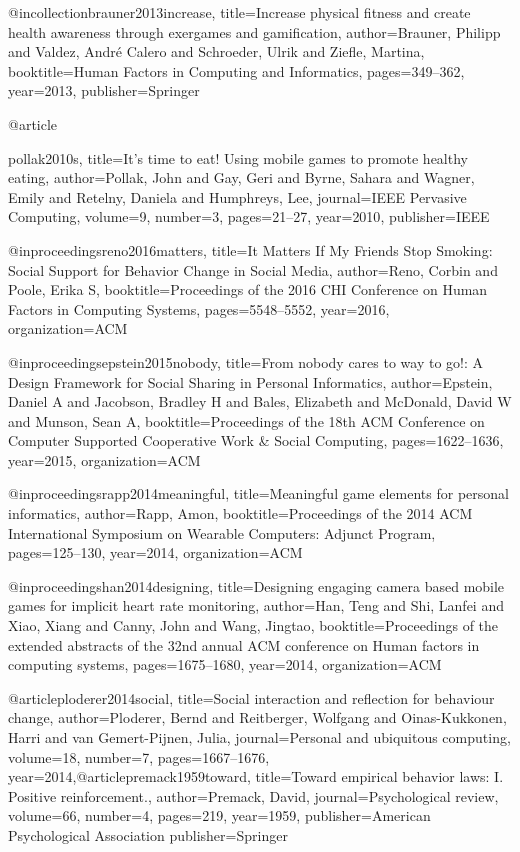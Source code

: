 @incollection{brauner2013increase,
  title={Increase physical fitness and create health awareness through exergames and gamification},
  author={Brauner, Philipp and Valdez, Andr{\'e} Calero and Schroeder, Ulrik and Ziefle, Martina},
  booktitle={Human Factors in Computing and Informatics},
  pages={349--362},
  year={2013},
  publisher={Springer}
}

@article{pollak2010s,
  title={It's time to eat! Using mobile games to promote healthy eating},
  author={Pollak, John and Gay, Geri and Byrne, Sahara and Wagner, Emily and Retelny, Daniela and Humphreys, Lee},
  journal={IEEE Pervasive Computing},
  volume={9},
  number={3},
  pages={21--27},
  year={2010},
  publisher={IEEE}
  
}


@inproceedings{reno2016matters,
  title={It Matters If My Friends Stop Smoking: Social Support for Behavior Change in Social Media},
  author={Reno, Corbin and Poole, Erika S},
  booktitle={Proceedings of the 2016 CHI Conference on Human Factors in Computing Systems},
  pages={5548--5552},
  year={2016},
  organization={ACM}
}


@inproceedings{epstein2015nobody,
  title={From nobody cares to way to go!: A Design Framework for Social Sharing in Personal Informatics},
  author={Epstein, Daniel A and Jacobson, Bradley H and Bales, Elizabeth and McDonald, David W and Munson, Sean A},
  booktitle={Proceedings of the 18th ACM Conference on Computer Supported Cooperative Work \& Social Computing},
  pages={1622--1636},
  year={2015},
  organization={ACM}
}

@inproceedings{rapp2014meaningful,
  title={Meaningful game elements for personal informatics},
  author={Rapp, Amon},
  booktitle={Proceedings of the 2014 ACM International Symposium on Wearable Computers: Adjunct Program},
  pages={125--130},
  year={2014},
  organization={ACM}
}

@inproceedings{han2014designing,
  title={Designing engaging camera based mobile games for implicit heart rate monitoring},
  author={Han, Teng and Shi, Lanfei and Xiao, Xiang and Canny, John and Wang, Jingtao},
  booktitle={Proceedings of the extended abstracts of the 32nd annual ACM conference on Human factors in computing systems},
  pages={1675--1680},
  year={2014},
  organization={ACM}
}


@article{ploderer2014social,
  title={Social interaction and reflection for behaviour change},
  author={Ploderer, Bernd and Reitberger, Wolfgang and Oinas-Kukkonen, Harri and van Gemert-Pijnen, Julia},
  journal={Personal and ubiquitous computing},
  volume={18},
  number={7},
  pages={1667--1676},
  year={2014},@article{premack1959toward,
  title={Toward empirical behavior laws: I. Positive reinforcement.},
  author={Premack, David},
  journal={Psychological review},
  volume={66},
  number={4},
  pages={219},
  year={1959},
  publisher={American Psychological Association}
}
  publisher={Springer}
}

